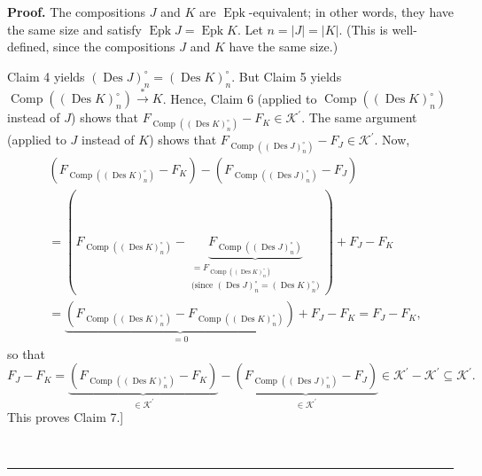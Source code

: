 \documentclass[numbers=enddot,12pt,final,onecolumn,notitlepage]{scrartcl}%
\theoremstyle{definition}
\newenvironment{proof}[1][Proof]{\noindent\textbf{#1.} }{\ \rule{0.5em}{0.5em}}
\newenvironment{verlong}{}{}
\begin{document}
\begin{verlong}
\begin{proof}
The compositions $J$ and $K$ are $\operatorname*{Epk}$-equivalent; in other
words, they have the same size and satisfy $\operatorname*{Epk}%
J=\operatorname*{Epk}K$. Let $n=\left\vert J\right\vert =\left\vert
K\right\vert $. (This is well-defined, since the compositions $J$ and $K$ have
the same size.)

Claim 4 yields $\left(  \operatorname*{Des}J\right)  _{n}^{\circ}=\left(
\operatorname*{Des}K\right)  _{n}^{\circ}$. But Claim 5 yields
$\operatorname*{Comp}\left(  \left(  \operatorname*{Des}K\right)  _{n}^{\circ
}\right)  \overset{\ast}{\rightarrow}K$. Hence, Claim 6 (applied to
$\operatorname*{Comp}\left(  \left(  \operatorname*{Des}K\right)  _{n}^{\circ
}\right)  $ instead of $J$) shows that $F_{\operatorname*{Comp}\left(  \left(
\operatorname*{Des}K\right)  _{n}^{\circ}\right)  }-F_{K}\in\mathcal{K}%
^{\prime}$. The same argument (applied to $J$ instead of $K$) shows that
$F_{\operatorname*{Comp}\left(  \left(  \operatorname*{Des}J\right)
_{n}^{\circ}\right)  }-F_{J}\in\mathcal{K}^{\prime}$. Now,%
\begin{align*}
&  \left(  F_{\operatorname*{Comp}\left(  \left(  \operatorname*{Des}K\right)
_{n}^{\circ}\right)  }-F_{K}\right)  -\left(  F_{\operatorname*{Comp}\left(
\left(  \operatorname*{Des}J\right)  _{n}^{\circ}\right)  }-F_{J}\right) \\
&  =\left(  F_{\operatorname*{Comp}\left(  \left(  \operatorname*{Des}%
K\right)  _{n}^{\circ}\right)  }-\underbrace{F_{\operatorname*{Comp}\left(
\left(  \operatorname*{Des}J\right)  _{n}^{\circ}\right)  }}%
_{\substack{=F_{\operatorname*{Comp}\left(  \left(  \operatorname*{Des}%
K\right)  _{n}^{\circ}\right)  }\\\text{(since }\left(  \operatorname*{Des}%
J\right)  _{n}^{\circ}=\left(  \operatorname*{Des}K\right)  _{n}^{\circ
}\text{)}}}\right)  +F_{J}-F_{K}\\
&  =\underbrace{\left(  F_{\operatorname*{Comp}\left(  \left(
\operatorname*{Des}K\right)  _{n}^{\circ}\right)  }-F_{\operatorname*{Comp}%
\left(  \left(  \operatorname*{Des}K\right)  _{n}^{\circ}\right)  }\right)
}_{=0}+F_{J}-F_{K}=F_{J}-F_{K},
\end{align*}
so that%
\[
F_{J}-F_{K}=\underbrace{\left(  F_{\operatorname*{Comp}\left(  \left(
\operatorname*{Des}K\right)  _{n}^{\circ}\right)  }-F_{K}\right)  }%
_{\in\mathcal{K}^{\prime}}-\underbrace{\left(  F_{\operatorname*{Comp}\left(
\left(  \operatorname*{Des}J\right)  _{n}^{\circ}\right)  }-F_{J}\right)
}_{\in\mathcal{K}^{\prime}}\in\mathcal{K}^{\prime}-\mathcal{K}^{\prime
}\subseteq\mathcal{K}^{\prime}.
\]
This proves Claim 7.]


\end{proof}
\end{verlong}
\end{document}
